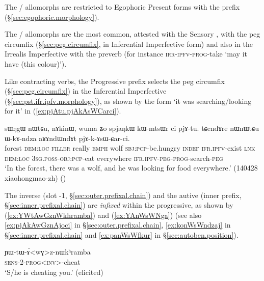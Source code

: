 The / allomorphs are restricted to Egophoric Present forms with the prefix  (§\ref{sec:egophoric.morphology}).

The / allomorphs are the most common, attested with the Sensory \hbox{,} with the peg circumfix (§\ref{sec:peg.circumfix}, in Inferential Imperfective form) and also in the Irrealis Imperfective with the preverb  (for instance  \textsc{irr}-\textsc{ipfv}-\textsc{prog}-take `may it have (this colour)').

 Like contracting verbs, the Progressive prefix selects the peg circumfix  (§\ref{sec:peg.circumfix}) in the Inferential Imperfective (§\ref{sec:pst.ifr.ipfv.morphology}), as shown by the form  `it was searching/looking for it' in (\ref{ex:pjAtu.pjAkAsWCarci}).

\begin{exe}
\ex \label{ex:pjAtu.pjAkAsWCarci}
\gll sɯŋgɯ nɯtɕu, nɤkinɯ, wuma ʑo spjaŋkɯ kɯ-mtsɯr ci pjɤ-tu. tɕendɤre nɯnɯtɕu ɯ-kɤ-ndza aʁɤndɯndɤt pjɤ-k-ɤsɯ-ɕar-ci. \\
forest \textsc{dem}:\textsc{loc} \textsc{filler} really \textsc{emph} wolf \textsc{sbj}:\textsc{pcp}-be.hungry \textsc{indef} \textsc{ifr}.\textsc{ipfv}-exist \textsc{lnk} \textsc{dem}:\textsc{loc} \textsc{3sg}.\textsc{poss}-\textsc{obj}:\textsc{pcp}-eat everywhere \textsc{ifr}.\textsc{ipfv}-\textsc{peg}-\textsc{prog}-search-\textsc{peg} \\
\glt `In the forest, there was a wolf, and he was looking for food everywhere.' (140428 xiaohongmao-zh)
()
\end{exe}

The inverse (slot -1, §\ref{sec:outer.prefixal.chain}) and the autive (inner prefix, §\ref{sec:inner.prefixal.chain}) are \textit{infixed} within the progressive, as shown by (\ref{ex:YWtAwGznWkhramba}) and (\ref{ex:YAnWsWNga})  (see also \ref{ex:pjAkAwGznAjoci} in §\ref{sec:outer.prefixal.chain}, \ref{ex:konWsWndzaj} in §\ref{sec:inner.prefixal.chain} and \ref{ex:panWsWfkur} in §\ref{sec:autoben.position}). 
 
\begin{exe}
\ex \label{ex:YWtAwGznWkhramba}
\gll ɲɯ-tɯ-ɤ́<wɣ>z-nɯkʰramba \\
\textsc{sens}-2-\textsc{prog}<\textsc{inv}>-cheat \\
\glt `S/he is cheating you.' (elicited)
\end{exe} 
 
